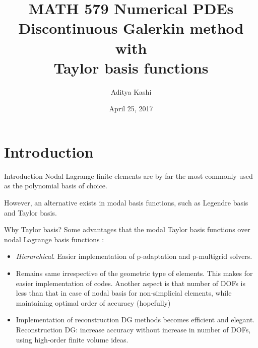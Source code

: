 \documentclass[11pt]{beamer}
\title{{\large MATH 579 Numerical PDEs} \vspace{0.2in} \\ Discontinuous Galerkin method with \\ Taylor basis functions}
\author{Aditya Kashi}
\date{April 25, 2017}
\begin{document}
\begin{frame}
\maketitle
\end{frame}

\section{Introduction}
\begin{frame}{Introduction}
Nodal Lagrange finite elements are by far the most commonly used as the polynomial basis of choice.
\vspace{0.2in}

However, an alternative exists in modal basis functions, such as Legendre basis and Taylor basis.
\end{frame}

\begin{frame}{Why Taylor basis?}
Some advantages that the modal Taylor basis functions over nodal Lagrange basis functions \cite{luo_taylor, aizinger_scaleseparation}:
\begin{itemize}
\item \emph{Hierarchical}. Easier implementation of p-adaptation  and p-multigrid solvers.
\item Remains same irrespective of the geometric type of elements. This makes for easier implementation of codes. Another aspect is that number of DOFs is less than that in case of nodal basis for non-simplicial elements, while maintaining optimal order of accuracy (hopefully)
\item Implementation of reconstruction DG methods becomes efficient and elegant. Reconstruction DG: increase accuracy without increase in number of DOFs, using high-order finite volume ideas.
\end{itemize}
\end{frame}
\end{document}
